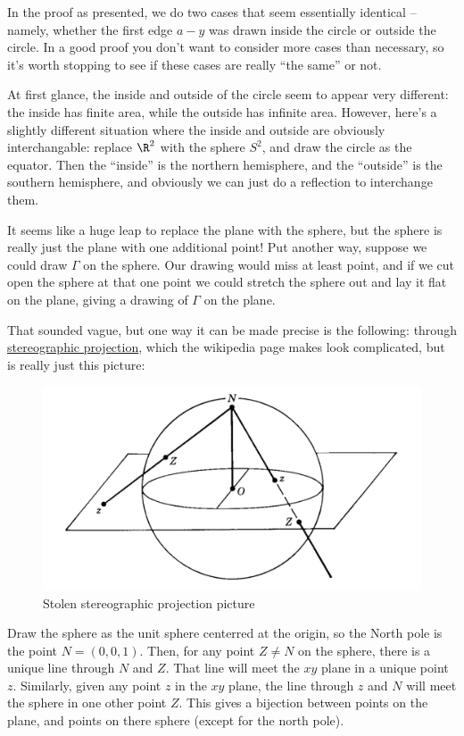 \documentclass[]{article}
\begin{document}
In the proof as presented, we do two cases that seem essentially
identical -- namely, whether the first edge \(a-y\) was drawn inside the
circle or outside the circle. In a good proof you don't want to consider
more cases than necessary, so it's worth stopping to see if these cases
are really ``the same'' or not.

At first glance, the inside and outside of the circle seem to appear
very different: the inside has finite area, while the outside has
infinite area. However, here's a slightly different situation where the
inside and outside are obviously interchangable: replace \(\R^2\) with
the sphere \(S^2\), and draw the circle as the equator. Then the
``inside'' is the northern hemisphere, and the ``outside'' is the
southern hemisphere, and obviously we can just do a reflection to
interchange them.

It seems like a huge leap to replace the plane with the sphere, but the
sphere is really just the plane with one additional point! Put another
way, suppose we could draw \(\Gamma\) on the sphere. Our drawing would
miss at least point, and if we cut open the sphere at that one point we
could stretch the sphere out and lay it flat on the plane, giving a
drawing of \(\Gamma\) on the plane.

That sounded vague, but one way it can be made precise is the following:
through
\href{https://en.wikipedia.org/wiki/Stereographic_projection}{stereographic
projection}, which the wikipedia page makes look complicated, but is
really just this picture:

\begin{figure}[htbp]
\centering
\includegraphics{stereographicprojection.jpg}
\caption{Stolen stereographic projection picture}
\end{figure}

Draw the sphere as the unit sphere centerred at the origin, so the North
pole is the point \(N=(0,0,1)\). Then, for any point \(Z\neq N\) on the
sphere, there is a unique line through \(N\) and \(Z\). That line will
meet the \(xy\) plane in a unique point \(z\). Similarly, given any
point \(z\) in the \(xy\) plane, the line through \(z\) and \(N\) will
meet the sphere in one other point \(Z\). This gives a bijection between
points on the plane, and points on there sphere (except for the north
pole).
\end{document}
